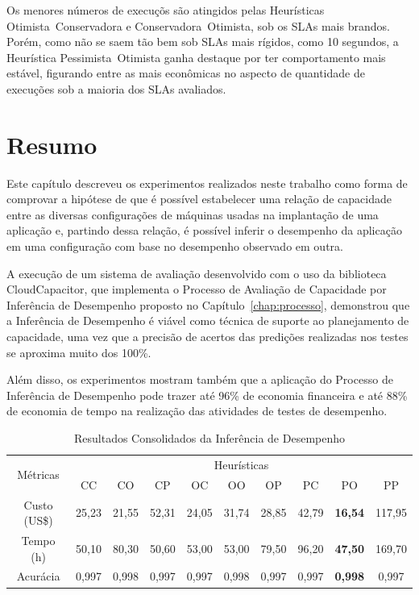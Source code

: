 Os menores números de execuçõs são atingidos pelas Heurísticas Otimista~Conservadora 
e Conservadora~Otimista, sob os SLAs mais brandos. Porém, como não se saem tão 
bem sob SLAs mais rígidos, como 10 segundos, a Heurística Pessimista~Otimista
ganha destaque por ter comportamento mais estável, figurando entre as mais 
econômicas no aspecto de quantidade de execuções sob a maioria dos SLAs avaliados.
 
\section{Resumo}
Este capítulo descreveu os experimentos realizados neste trabalho como forma de
comprovar a hipótese de que é possível estabelecer uma relação de capacidade
entre as diversas configurações de máquinas usadas na implantação de uma aplicação
e, partindo dessa relação, é possível inferir o desempenho da aplicação em uma
configuração com base no desempenho observado em outra.

A execução de um sistema de avaliação desenvolvido com o uso da biblioteca 
CloudCapacitor, que implementa o Processo de Avaliação de Capacidade
por Inferência de Desempenho proposto no Capítulo~\ref{chap:processo}, demonstrou
que a Inferência de Desempenho é viável como técnica de suporte ao 
planejamento de capacidade, uma vez que a precisão de acertos das predições 
realizadas nos testes se aproxima muito dos 100\%.

Além disso, os experimentos mostram também que a aplicação do Processo de Inferência 
de Desempenho pode trazer até 96\% de economia financeira e até 88\% de economia 
de tempo na realização das atividades de testes de desempenho.

\begin{table}[htbp]
  \centering
    \begin{tabular}{|c|c|c|c|c|c|c|c|c|c|}
    \hline
    \multirow{2}{*}{Métricas} & \multicolumn{9}{c|}{Heurísticas} \\
    \cline{2-10}
                 & CC    & CO    & CP    & OC    & OO    & OP    & PC    & PO    & PP \\
    \hline
    Custo (US\$) & 25,23 & 21,55 & 52,31 & 24,05 & 31,74 & 28,85 & 42,79 & \cellcolor{OliveGreen}\textbf{\color{yellow}16,54} & 117,95 \\
    Tempo (h)    & 50,10 & 80,30 & 50,60 & 53,00 & 53,00 & 79,50 & 96,20 & \cellcolor{OliveGreen}\textbf{\color{yellow}47,50} & 169,70 \\
    Acurácia     & 0,997 & 0,998 & 0,997 & 0,997 & 0,998 & 0,997 & 0,997 & \cellcolor{OliveGreen}\textbf{\color{yellow}0,998} & 0,997  \\
    \hline
    \end{tabular}%
  \caption{\label{table:resultado_consolidado}Resultados Consolidados da Inferência de Desempenho}
  \label{tab:addlabel}%
\end{table}%

